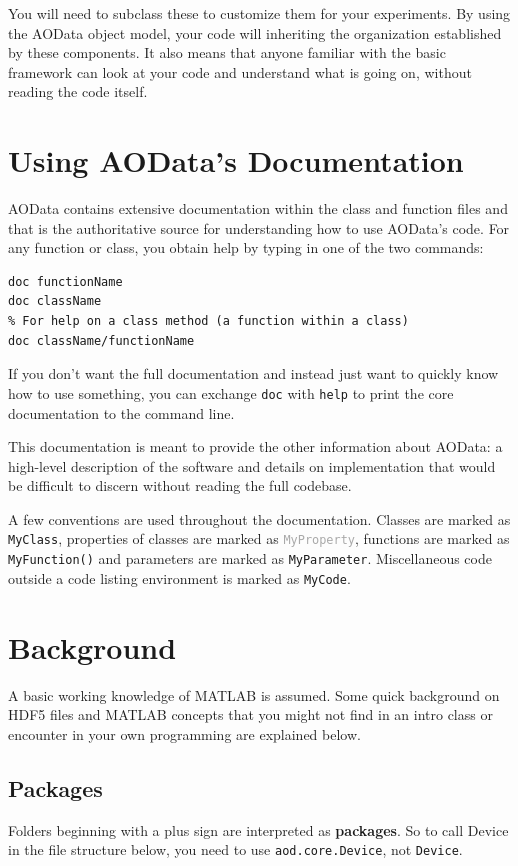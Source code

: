 \documentclass[10pt]{exam}
\newcommand\aodparam[1]{\textcolor{codepurple}{\texttt{#1}}}
\newcommand\aodclass[1]{\textcolor{codeblue}{\texttt{#1}}}
\newcommand\aodprop[1]{\textcolor{darkgray}{\texttt{#1}}}
\newcommand\aodfcn[1]{\textcolor{darkteal}{\texttt{#1}}}
\begin{document}
	You will need to subclass these to customize them for your experiments. By using the AOData object model, your code will inheriting the organization established by these components. It also means that anyone familiar with the basic framework can look at your code and understand what is going on, without reading the code itself.

\section{Using AOData's Documentation}
	\label{section:DocInfo}
	\noindent AOData contains extensive documentation within the class and function files and that is the authoritative source for understanding how to use AOData's code. For any function or class, you obtain help by typing in one of the two commands:
    \begin{lstlisting}[style=matlab-editor, basicstyle=\mlttfamily\footnotesize]
% For help on a function or class 
doc functionName
doc className
% For help on a class method (a function within a class)
doc className/functionName
    \end{lstlisting}
    If you don't want the full documentation and instead just want to quickly know how to use something, you can exchange \texttt{doc} with \texttt{help} to print the core documentation to the command line.

    
    This documentation is meant to provide the other information about AOData: a high-level description of the software and details on implementation that would be difficult to discern without reading the full codebase. 
	
	A few conventions are used throughout the documentation. Classes are marked as \aodclass{MyClass}, properties of classes are marked as \aodprop{MyProperty}, functions are marked as \aodfcn{MyFunction()} and parameters are marked as \aodparam{MyParameter}. Miscellaneous code outside a code listing environment is marked as \texttt{MyCode}.
	
\section{Background}
	\noindent A basic working knowledge of MATLAB is assumed. Some quick background on HDF5 files and MATLAB concepts that you might not find in an intro class or encounter in your own programming are explained below. 
	
	\subsection{Packages}
		\noindent Folders beginning with a plus sign are interpreted as \textbf{packages}. So to call Device in the file structure below, you need to use \aodclass{aod.core.Device}, not \aodclass{Device}. \\$\quad$\vspace{-2ex}\\
	
\end{document}
